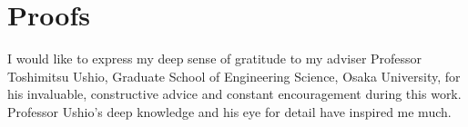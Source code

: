 \documentclass[a4j,12pt,oneside,openany,english,dvipdfmx]{jsbook}
\begin{document}
\chapter{Proofs}





\begin{acknowledgement}
	I would like to express my deep sense of gratitude to my adviser Professor
	Toshimitsu Ushio, Graduate School of Engineering Science, Osaka University,
	for his invaluable, constructive advice and constant encouragement during this work.
	Professor Ushio's deep knowledge and his eye for detail have inspired me much.
\end{acknowledgement}
\end{document}
